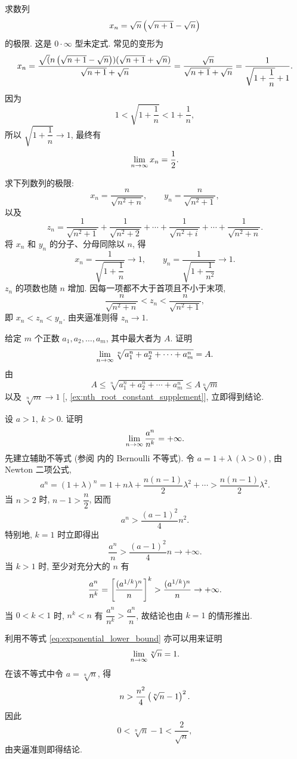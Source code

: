 \label{ex:radical_product_limit}
求数列
$$
x_n=\sqrt n\left( \sqrt{n+1}-\sqrt n \right)
$$
的极限. 这是 $0\cdot\infty$ 型未定式.
常见的变形为
$$
x_n
=\frac{\sqrt (n\left( \sqrt{n+1}-\sqrt n \right))(\sqrt{n+1}+\sqrt n)}{\sqrt{n+1}+\sqrt n}
=\frac{\sqrt n}{\sqrt{n+1}+\sqrt n}
=\frac{1}{\sqrt{1+\dfrac1n}+1}.
$$
因为
$$
1<\sqrt{1+\frac1n}<1+\frac1n,
$$
所以 $\sqrt{1+\dfrac1n}\to1$, 最终有
$$
\lim\limits_{n \to \infty}x_n=\frac12.
$$

\label{ex:variable_length_sum_limit}
求下列数列的极限:
$$
x_n=\frac{n}{\sqrt{n^2+n}},\qquad
y_n=\frac{n}{\sqrt{n^2+1}},
$$
以及
$$
z_n=\frac1{\sqrt{n^2+1}}+\frac1{\sqrt{n^2+2}}+\cdots+
\frac1{\sqrt{n^2+i}}+\cdots+\frac1{\sqrt{n^2+n}}.
$$
将 $x_n$ 和 $y_n$ 的分子、分母同除以 $n$, 得
$$
x_n=\frac1{\sqrt{1+\dfrac1n}}\to1,\qquad
y_n=\frac1{\sqrt{1+\dfrac1{n^2}}}\to1.
$$
$z_n$ 的项数也随 $n$ 增加. 因每一项都不大于首项且不小于末项,
$$
\frac{n}{\sqrt{n^2+n}}<z_n<\frac{n}{\sqrt{n^2+1}},
$$
即 $x_n<z_n<y_n$. 由夹逼准则得 $z_n\to1$.

\label{ex:max_nth_root_limit}
给定 $m$ 个正数 $a_1,a_2,\ldots,a_m$, 其中最大者为 $A$. 证明
$$
\lim\limits_{n \to \infty}\sqrt[n]{a_1^n+a_2^n+\cdots+a_m^n}=A.
$$
由
$$
A\leq\sqrt[n]{a_1^n+a_2^n+\cdots+a_m^n}
\leq A\sqrt[n]{m}
$$
以及 $\sqrt[n]{m}\to1$ [, \ref{ex:nth_root_constant_supplement}], 立即得到结论.

\label{ex:exponential_dominates_power}\label{muchbigger}
设 $a>1,\ k>0$. 证明
$$
\lim\limits_{n \to \infty}\frac{a^n}{n^k}=+\infty.
$$
先建立辅助不等式 (参阅  内的 Bernoulli 不等式).
令 $a=1+\lambda\ (\lambda>0)$, 由 Newton 二项公式,
$$
a^n=(1+\lambda)^n
= 1 + n\lambda + \frac{n(n-1)}{2}\lambda^2 + \cdots
> \frac{n(n-1)}{2}\lambda^2.
$$
当 $n>2$ 时, $n-1>\dfrac n2$, 因而
\begin{equation}\label{eq:exponential_lower_bound}
a^n>\frac{(a-1)^2}{4}n^2.
\end{equation}
特别地, $k=1$ 时立即得出
$$
\frac{a^n}{n}>\frac{(a-1)^2}{4}n\to+\infty.
$$
当 $k>1$ 时, 至少对充分大的 $n$ 有
$$
\frac{a^n}{n^k}
=\left[ \frac{(a^{1/k})^n}{n} \right]^k
>\frac{(a^{1/k})^n}{n}\to+\infty.
$$
当 $0<k<1$ 时, $n^k<n$ 有 $\dfrac{a^n}{n^k}> \dfrac{a^n}{n}$,
故结论也由 $k=1$ 的情形推出.

\label{ex:nth_root_n_limit}
利用不等式 \eqref{eq:exponential_lower_bound} 亦可以用来证明
$$
\lim\limits_{n \to \infty}\sqrt[n]{n}=1.
$$
在该不等式中令 $a=\sqrt[n]{n}$, 得
$$
n>\frac{n^2}{4}\left( \sqrt[n]{n}-1 \right)^2.
$$
因此
$$
0<\sqrt[n]{n}-1<\frac{2}{\sqrt n},
$$
由夹逼准则即得结论.

